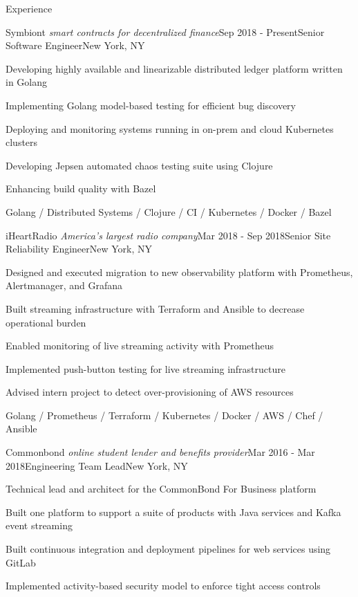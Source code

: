 \documentclass{resume} %
\begin{document}
\begin{rSection}{Experience}

\begin{rSubsection}{Symbiont \textit{\scriptsize smart contracts for decentralized finance}}{Sep 2018 - Present}{Senior Software Engineer}{New York, NY}
\item Developing highly available and linearizable distributed ledger platform written in Golang
\item Implementing Golang model-based testing for efficient bug discovery
\item Deploying and monitoring systems running in on-prem and cloud Kubernetes clusters
\item Developing Jepsen automated chaos testing suite using Clojure
\item Enhancing build quality with Bazel

Golang / Distributed Systems / Clojure / CI / Kubernetes / Docker / Bazel
\end{rSubsection}


\begin{rSubsection}{iHeartRadio \textit{\scriptsize America's largest radio company}}{Mar 2018 - Sep 2018}{Senior Site Reliability Engineer}{New York, NY}
\item Designed and executed migration to new observability platform with Prometheus, Alertmanager, and Grafana
\item Built streaming infrastructure with Terraform and Ansible to decrease operational burden
\item Enabled monitoring of live streaming activity with Prometheus
\item Implemented push-button testing for live streaming infrastructure
\item Advised intern project to detect over-provisioning of AWS resources

Golang / Prometheus / Terraform / Kubernetes / Docker / AWS / Chef / Ansible
\end{rSubsection}


\begin{rSubsection}{Commonbond \textit{\scriptsize online student lender and benefits provider}}{Mar 2016 - Mar 2018}{Engineering Team Lead}{New York, NY}
\item Technical lead and architect for the CommonBond For Business platform
\item Built one platform to support a suite of products with Java services and Kafka event streaming
\item Built continuous integration and deployment pipelines for web services using GitLab
\item Implemented activity-based security model to enforce tight access controls


\end{rSubsection}
\end{rSection}
\end{document}
